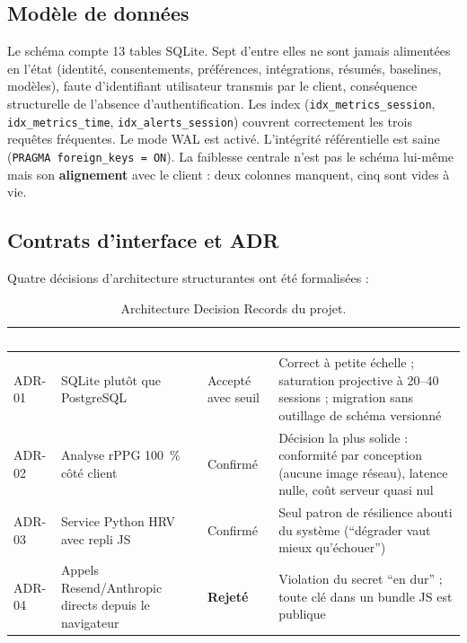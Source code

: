 \documentclass[11pt,a4paper]{article}
\begin{document}
\subsection{Modèle de données}
Le schéma compte 13 tables SQLite. Sept d'entre elles ne sont jamais alimentées en l'état (identité,
consentements, préférences, intégrations, résumés, baselines, modèles), faute d'identifiant utilisateur
transmis par le client, conséquence structurelle de l'absence d'authentification. Les index
(\texttt{idx\_metrics\_session}, \texttt{idx\_metrics\_time}, \texttt{idx\_alerts\_session}) couvrent
correctement les trois requêtes fréquentes. Le mode WAL est activé. L'intégrité référentielle est
saine (\texttt{PRAGMA foreign\_keys = ON}). La faiblesse centrale n'est pas le schéma lui-même mais
son \textbf{alignement} avec le client : deux colonnes manquent, cinq sont vides à vie.

\subsection{Contrats d'interface et ADR}
Quatre décisions d'architecture structurantes ont été formalisées :

\begin{table}[H]
\centering\small
\begin{tabularx}{\linewidth}{p{1.4cm} p{3.9cm} p{1.9cm} X}
\toprule
\rowcolor{cwblue} \textcolor{white}{\bf ADR} & \textcolor{white}{\bf Décision} & \textcolor{white}{\bf Statut} &
\textcolor{white}{\bf Enseignement} \\
\midrule
ADR-01 & SQLite plutôt que PostgreSQL & Accepté avec seuil & Correct à petite échelle ; saturation
 projective à 20--40 sessions ; migration sans outillage de schéma versionné \\
ADR-02 & Analyse rPPG 100~\% côté client & Confirmé & Décision la plus solide : conformité par
 conception (aucune image réseau), latence nulle, coût serveur quasi nul \\
ADR-03 & Service Python HRV avec repli JS & Confirmé & Seul patron de résilience abouti du système
 (``dégrader vaut mieux qu'échouer'') \\
ADR-04 & Appels Resend/Anthropic directs depuis le navigateur & \textbf{Rejeté} & Violation du secret
 ``en dur'' ; toute clé dans un bundle JS est publique \\
\bottomrule
\end{tabularx}
\caption{Architecture Decision Records du projet.}
\label{tab:adr}
\end{table}
\end{document}
